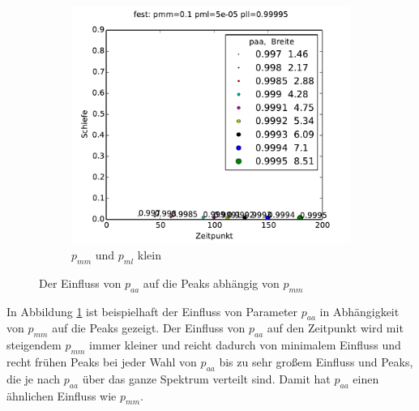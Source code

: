\begin{figure}
\begin{subfigure}[t]{0.5\textwidth}
\includegraphics[width=\textwidth]{bilder/paa/3fest_01_5e-05_p_099995}
\caption{$p_{mm}$ und $p_{ml}$ klein}
\end{subfigure}
\caption{Der Einfluss von $p_{aa}$ auf die Peaks abhängig von $p_{mm}$}
\label{einfluss_paa}
\end{figure}

In Abbildung \ref{einfluss_paa} ist beispielhaft der Einfluss von Parameter $p_{aa}$ in Abhängigkeit von $p_{mm}$ auf die Peaks gezeigt. Der Einfluss von $p_{aa}$ auf den Zeitpunkt wird mit steigendem $p_{mm}$ immer kleiner und reicht dadurch von minimalem Einfluss und recht frühen Peaks bei jeder Wahl von $p_{aa}$ bis zu sehr großem Einfluss und Peaks, die je nach $p_{aa}$ über das ganze Spektrum verteilt sind. Damit hat $p_{aa}$ einen ähnlichen Einfluss wie $p_{mm}$.

